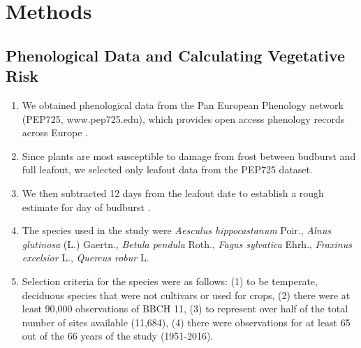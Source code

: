 \documentclass{article}\usepackage[]{graphicx}\usepackage[]{color}
\begin{document}
\section*{Methods}
\subsection*{Phenological Data and Calculating Vegetative Risk}
\begin{enumerate}
\item We obtained phenological data from the Pan European Phenology network (PEP725, www.pep725.edu), which provides open access phenology records across Europe \citep{Templ2018}.
\item Since plants are most susceptible to damage from frost between budburst and full leafout, we selected only leafout data \citep[i.e., in][BBCH 11, which is defined as the point of leaf unfolding and the first visible leaf stalk]{Meier2001} from the PEP725 dataset.
\item We then subtracted 12 days from the leafout date to establish a rough estimate for day of budburst \citep{Donnelly2017}. 
\item The species used in the study were \textit{Aesculus hippocastanum} Poir., \textit{Alnus glutinosa} (L.) Gaertn., \textit{Betula pendula} Roth., \textit{Fagus sylvatica} Ehrh., \textit{Fraxinus excelsior} L., \textit{Quercus robur} L.
\item Selection criteria for the species were as follows: (1) to be temperate, deciduous species that were not cultivars or used for crops, (2) there were at least 90,000 observations of BBCH 11, (3) to represent over half of the total number of sites available (11,684), (4) there were observations for at least 65 out of the 66 years of the study (1951-2016). %
\end{enumerate}
\end{document}
